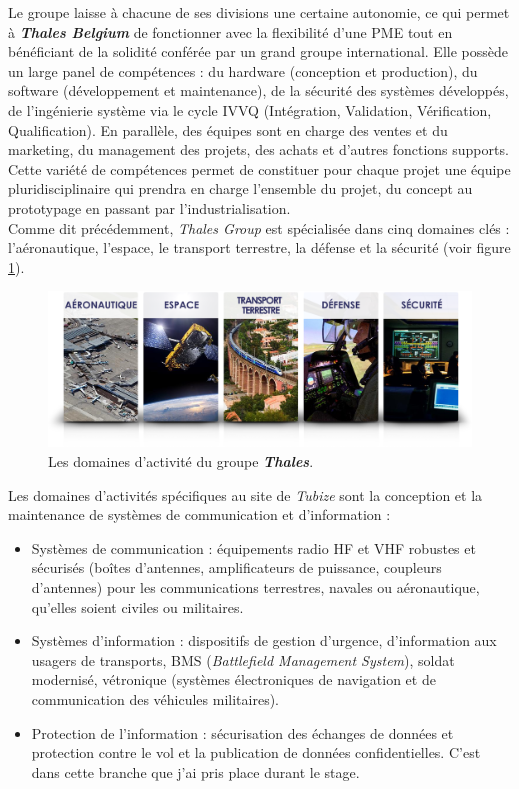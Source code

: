 \documentclass[10pt, oneside, a4paper]{article}
\begin{document}
\hspace{-0.5 cm}Le groupe laisse à chacune de ses divisions une certaine autonomie, ce qui permet à \textbf{\textit{Thales Belgium}} de fonctionner avec la flexibilité d’une PME tout en bénéficiant de la solidité conférée par un grand groupe international. Elle possède un large panel de compétences : du hardware (conception et production), du software (développement et maintenance), de la sécurité des systèmes développés, de l’ingénierie système via le cycle IVVQ (Intégration, Validation, Vérification, Qualification). En parallèle, des équipes sont en charge des ventes et du marketing, du management des projets, des achats et d’autres fonctions supports. Cette variété de compétences permet de constituer pour chaque projet une équipe pluridisciplinaire qui prendra en charge l’ensemble du projet, du concept au prototypage en passant par l’industrialisation. \\

Comme dit précédemment, \textit{Thales Group} est spécialisée dans cinq domaines clés : l'aéronautique, l'espace, le transport terrestre, la défense et la sécurité (voir figure \ref{fig:thales}). 
\begin{figure}[htbp]
    \centering
    \includegraphics[scale=0.56]{image/thales}
    \caption{Les domaines d'activité du groupe \textbf{\textit{Thales}}.}
    \label{fig:thales}
\end{figure}

\vspace{-0.4 cm}\hspace{-0.5 cm}Les domaines d’activités spécifiques au site de \textit{Tubize} sont la conception et la maintenance de systèmes de communication et d’information :
\begin{itemize}
\item Systèmes de communication : équipements radio HF et VHF robustes et sécurisés (boîtes d’antennes, amplificateurs de puissance, coupleurs d’antennes) pour les communications terrestres, navales ou aéronautique, qu’elles soient civiles ou militaires.
\item Systèmes d’information : dispositifs de gestion d’urgence, d’information aux usagers de transports, BMS (\textit{Battlefield Management System}), soldat modernisé, vétronique (systèmes électroniques de navigation et de communication des véhicules militaires).
\item Protection de l’information : sécurisation des échanges de données et protection contre le vol et la publication de données confidentielles. C'est dans cette branche que j'ai pris place durant le stage.\\
\end{itemize}
\end{document}

